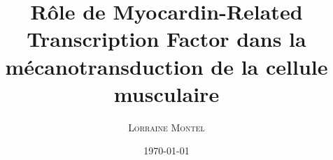 \documentclass[10pt,twoside,openright]{report}
\author{\textsc{Lorraine Montel}}
\title{Rôle de Myocardin-Related Transcription Factor dans la mécanotransduction de la cellule musculaire}
\date{\today}
\begin{document}
\pagedegarde



\tableofcontents
























\newpage
\printbibliography
\end{document}
